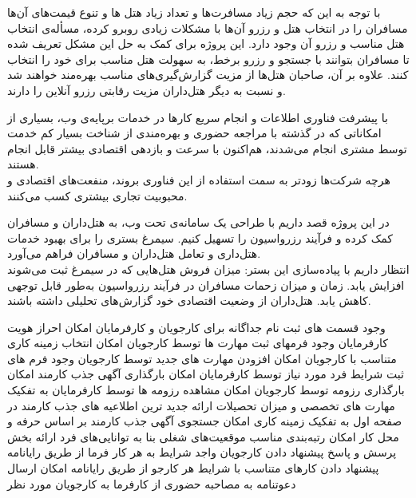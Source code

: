 با توجه به این که حجم زیاد مسافرت‌ها و تعداد زیاد هتل ها و تنوع قیمت‌های آن‌ها مسافران را در انتخاب هتل و رزرو آن‌ها با مشکلات زیادی روبرو کرده، مسأله‌ی انتخاب هتل مناسب و رزرو آن وجود دارد. این پروژه برای کمک به حل این مشکل تعریف شده تا مسافران بتوانند با جستجو و رزرو برخط، به سهولت هتل مناسب برای خود را انتخاب کنند. علاوه بر آن، صاحبان هتل‌ها از مزیت گزارش‌گیری‌های مناسب بهره‌مند خواهند شد و نسبت به دیگر هتل‌داران مزیت رقابتی رزرو آنلاین را دارند.


با پیشرفت فناوری اطلاعات و انجام سریع کارها در خدمات برپایه‌ی وب، بسیاری از امکاناتی که در گذشته با مراجعه حضوری و بهره‌مندی از شناخت بسیار کم خدمت توسط مشتری انجام می‌شدند، هم‌اکنون با سرعت و بازدهی اقتصادی بیشتر قابل انجام هستند.
\\
هرچه شرکت‌ها زودتر به سمت استفاده از این فناوری بروند، منفعت‌های اقتصادی و محبوبیت تجاری بیشتری کسب می‌کنند.

در این پروژه قصد داریم با طراحی یک سامانه‌ی تحت وب، به هتل‌داران و مسافران کمک کرده و فرآیند رزرواسیون را تسهیل کنیم. سیمرغ بستری را برای بهبود خدمات هتل‌داری و تعامل هتل‌داران و مسافران فراهم می‌آورد.
\\
انتظار داریم با پیاده‌سازی این بستر:
 میزان فروش هتل‌هایی که در سیمرغ ثبت می‌شوند افزایش یابد.
 زمان و میزان زحمات مسافران در فرآیند رزرواسیون به‌طور قابل توجهی کاهش یابد.
 هتل‌داران از وضعیت اقتصادی خود گزارش‌های تحلیلی داشته باشند.

 وجود قسمت های ثبت نام جداگانه برای کارجویان و کارفرمایان
 امکان احراز هویت کارفرمایان 
 وجود فرمهای ثبت مهارت ها توسط کارجویان
 امکان انتخاب زمینه کاری متناسب با کارجویان
 امکان افزودن مهارت های جدید توسط کارجویان 
 وجود فرم های ثبت شرایط فرد مورد نیاز توسط کارفرمایان
 امکان بارگذاری آگهی جذب کارمند 
 امکان بارگذاری رزومه توسط کارجویان
 امکان مشاهده رزومه ها توسط کارفرمایان به تفکیک مهارت های تخصصی و میزان تحصیلات
 ارائه جدید ترین اطلاعیه های جذب کارمند در صفحه اول به تفکیک زمینه کاری
 امکان جستجوی آگهی جذب کارمند بر اساس حرفه و محل کار 
 امکان رتبه‌بندی مناسب موقعیت‌های شغلی بنا به توانایی‌های فرد
 ارائه بخش پرسش و پاسخ
 پیشنهاد دادن کارجویان واجد شرایط به هر کار فرما از طریق رایانامه  
 پیشنهاد دادن کارهای متناسب با شرایط هر کارجو  از طریق رایانامه
 امکان ارسال دعوتنامه به مصاحبه حضوری از کارفرما به کارجویان مورد نظر

